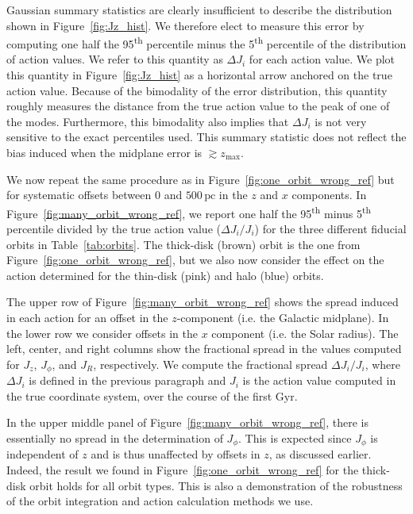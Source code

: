\documentclass[twocolumn]{aastex62}
\newcommand{\pc}{\text{pc}}
\newcommand{\Gyr}{\text{Gyr}}
\newcommand{\uth}{\textsuperscript{th}}
\newcommand{\thincolor}{pink}
\newcommand{\thickcolor}{brown}
\newcommand{\halocolor}{blue}
\begin{document}
Gaussian summary statistics are clearly insufficient to describe the distribution shown in
Figure~\ref{fig:Jz_hist}. We therefore elect to measure this error by computing one
half the 95\uth{} percentile minus the 5\uth{} percentile of the distribution
of action values. We refer to this quantity as $\Delta J_i$ for each
action value. We plot this quantity in Figure~\ref{fig:Jz_hist} as a
horizontal arrow anchored on the true action value. Because of the bimodality
of the error distribution, this quantity roughly measures the distance from
the true action value to the peak of one of the modes. Furthermore, this
bimodality also implies that $\Delta J_i$ is not very sensitive to the exact
percentiles used. This summary statistic does not reflect the bias induced
when the midplane error is $\gtrsim z_{\text{max}}$.

We now repeat the same procedure as in Figure~\ref{fig:one_orbit_wrong_ref}
but for systematic offsets between $0$ and $500\,\pc$ in the $z$ and $x$
components. In Figure~\ref{fig:many_orbit_wrong_ref}, we report one half the
95\uth{} minus 5\uth{} percentile divided by the true action value ($\Delta
J_i/J_i$) for the three different fiducial orbits in Table~\ref{tab:orbits}.
The thick-disk (\thickcolor) orbit is the one from
Figure~\ref{fig:one_orbit_wrong_ref}, but we also now consider the effect on
the action determined for the thin-disk (\thincolor) and halo (\halocolor)
orbits.

The upper row of Figure~\ref{fig:many_orbit_wrong_ref} shows the spread
induced in each action for an offset in the $z$-component (i.e. the Galactic
midplane). In the lower row we consider offsets in the $x$ component (i.e. the
Solar radius). The left, center, and right columns show the fractional spread
in the values computed for $J_z$, $J_{\phi}$, and $J_R$, respectively. We
compute the fractional spread $\Delta J_i/J_i$, where $\Delta J_i$ is defined
in the previous paragraph and $J_i$ is the action value computed in the true
coordinate system, over the course of the first $\Gyr$.

In the upper middle panel of Figure~\ref{fig:many_orbit_wrong_ref}, there is
essentially no spread in the determination of $J_{\phi}$. This is expected
since $J_{\phi}$ is independent of $z$ and is thus unaffected by offsets in
$z$, as discussed earlier. Indeed, the result we found in
Figure~\ref{fig:one_orbit_wrong_ref} for the thick-disk orbit holds for all
orbit types. This is also a demonstration of the robustness of the orbit
integration and action calculation methods we use.
 
\end{document}
